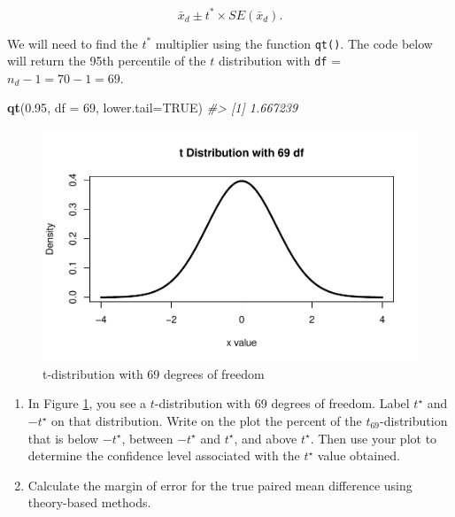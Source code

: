 \documentclass[
]{report}
\newenvironment{Shaded}{\begin{snugshade}}{\end{snugshade}}
\newcommand{\AttributeTok}[1]{\textcolor[rgb]{0.13,0.29,0.53}{#1}}
\newcommand{\CommentTok}[1]{\textcolor[rgb]{0.56,0.35,0.01}{\textit{#1}}}
\newcommand{\ConstantTok}[1]{\textcolor[rgb]{0.56,0.35,0.01}{#1}}
\newcommand{\DecValTok}[1]{\textcolor[rgb]{0.00,0.00,0.81}{#1}}
\newcommand{\FloatTok}[1]{\textcolor[rgb]{0.00,0.00,0.81}{#1}}
\newcommand{\FunctionTok}[1]{\textcolor[rgb]{0.13,0.29,0.53}{\textbf{#1}}}
\newcommand{\NormalTok}[1]{#1}
\begin{document}
\[\bar{x}_d\pm t^* \times SE(\bar{x}_d).\]

\newpage

We will need to find the \(t^*\) multiplier using the function \texttt{qt()}. The code below will return the 95th percentile of the \(t\) distribution with \texttt{df} = \(n_d - 1 = 70 - 1 = 69\).

\begin{Shaded}
\begin{Highlighting}[]
\FunctionTok{qt}\NormalTok{(}\FloatTok{0.95}\NormalTok{, }\AttributeTok{df =} \DecValTok{69}\NormalTok{, }\AttributeTok{lower.tail=}\ConstantTok{TRUE}\NormalTok{)}
\CommentTok{\#\textgreater{} [1] 1.667239}
\end{Highlighting}
\end{Shaded}

\begin{figure}

{\centering \includegraphics[width=0.7\linewidth]{11-OCA08-paired-theory_files/figure-latex/tstar-1} 

}

\caption{t-distribution with 69 degrees of freedom}\label{fig:tstar}
\end{figure}

\begin{enumerate}
\def\labelenumi{\arabic{enumi}.}
\setcounter{enumi}{9}
\item
  In Figure \ref{fig:tstar}, you see a \(t\)-distribution with 69 degrees of freedom. Label \(t^\star\) and \(-t^\star\) on that distribution. Write on the plot the percent of the \(t_{69}\)-distribution that is below \(-t^\star\), between \(-t^\star\) and \(t^\star\), and above \(t^\star\). Then use your plot to determine the confidence level associated with the \(t^\star\) value obtained.
  \vspace{0.3in}
\item
  Calculate the margin of error for the true paired mean difference using theory-based methods.
\end{enumerate}
\end{document}
